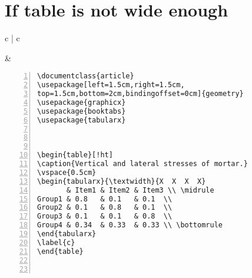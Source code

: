 \section{If table is not wide enough}
\begin{tabular}{c | c}
\begin{minipage}[m]{0.4\textwidth}
\end{minipage}
&
\begin{minipage}[m]{0.55\textwidth}
\renewcommand\textminus{\mbox{-}}%
\begin{lstlisting}[numberstyle=\zebra{green!15}{yellow!15},numbers=left,basicstyle=\footnotesize] 
\documentclass{article}
\usepackage[left=1.5cm,right=1.5cm,
top=1.5cm,bottom=2cm,bindingoffset=0cm]{geometry}
\usepackage{graphicx}
\usepackage{booktabs}
\usepackage{tabularx}


           
\begin{table}[!ht] 
\caption{Vertical and lateral stresses of mortar.}  
\vspace{0.5cm}
\begin{tabularx}{\textwidth}{X  X  X  X}
       & Item1 & Item2 & Item3 \\ \midrule
Group1 & 0.8   & 0.1   & 0.1  \\
Group2 & 0.1   & 0.8   & 0.1  \\
Group3 & 0.1   & 0.1   & 0.8  \\
Group4 & 0.34  & 0.33  & 0.33 \\ \bottomrule
\end{tabularx}
\label{c}
\end{table}

        
\end{lstlisting}
\end{minipage}
\end{tabular}













 
 